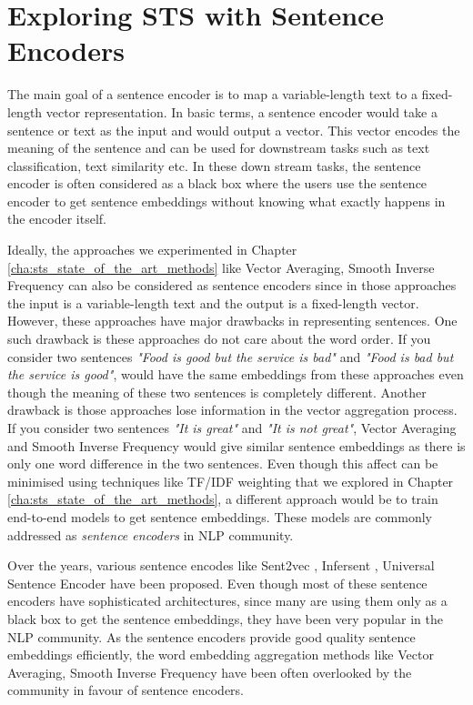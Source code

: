 \chapter{\label{cha:sts_sentence_encoders}Exploring STS with Sentence Encoders}

The main goal of a sentence encoder is to map a variable-length text to a fixed-length vector representation. In basic terms, a sentence encoder would take a sentence or text as the input and would output a vector. This vector encodes the meaning of the sentence and can be used for downstream tasks such as text classification, text similarity etc. In these down stream tasks, the sentence encoder is often considered as a black box where the users use the sentence encoder to get sentence embeddings without knowing what exactly happens in the encoder itself. 

Ideally, the approaches we experimented in Chapter \ref{cha:sts_state_of_the_art_methods} like Vector Averaging, Smooth Inverse Frequency \cite{DBLP:conf/iclr/AroraLM17} can also be considered as sentence encoders since in those approaches the input is a variable-length text and the output is a fixed-length vector. However, these approaches have major drawbacks in representing sentences. One such drawback is these approaches do not care about the word order. If you consider two sentences \textit{"Food is good but the service is bad"} and \textit{"Food is bad but the service is good"}, would have the same embeddings from these approaches even though the meaning of these two sentences is completely different. Another drawback is those approaches lose information in the vector aggregation process. If you consider two sentences \textit{"It is great"} and \textit{"It is not great"}, Vector Averaging and Smooth Inverse Frequency would give similar sentence embeddings as there is only one word difference in the two sentences. Even though this affect can be minimised using techniques like TF/IDF weighting that we explored in Chapter \ref{cha:sts_state_of_the_art_methods}, a different approach would be to train end-to-end models to get sentence embeddings. These models are commonly addressed as \textit{sentence encoders} in NLP community.

Over the years, various sentence encodes like Sent2vec \cite{pagliardini-etal-2018-unsupervised}, Infersent  \cite{cer2018universal}, Universal Sentence Encoder \cite{conneau-EtAl:2017:EMNLP2017} have been proposed. Even though most of these sentence encoders have sophisticated architectures, since many are using them only as a black box to get the sentence embeddings, they have been very popular in the NLP community. As the sentence encoders provide good quality sentence embeddings efficiently, the word embedding aggregation methods like Vector Averaging, Smooth Inverse Frequency have been often overlooked by the community in favour of sentence encoders. 

